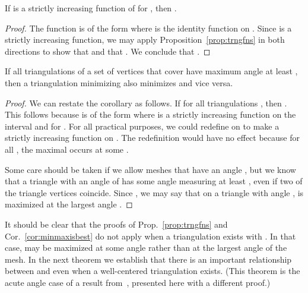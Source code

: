 \documentclass[final]{siamltex}
\begin{document}
\bigskip

\begin{corollary}
  If  is a strictly increasing function of  for , then .
\end{corollary}

\begin{proof}
  The function  is of the form  where  is the
  identity function on .  Since  is a strictly increasing
  function, we may apply Proposition~\ref{prop:trngfns} in both
  directions to show that 
  and that .  We conclude
  that .
\end{proof}

\bigskip

\begin{corollary}
\label{cor:minmaxisbest}
If all triangulations of a set of vertices  that cover
 have maximum angle at least , then a
triangulation minimizing  also minimizes  and vice
versa.
\end{corollary}
\begin{proof}
  We can restate the corollary as follows.  If  for
  all triangulations , then .  This follows because  is of the form 
  where  is a strictly
  increasing function on the interval  and  for .  For all practical purposes, we
  could redefine  on  to make  a strictly increasing
  function on .  The redefinition would have no effect
  because for all , the maximal  occurs at some
  .

  Some care should be taken if we allow meshes that have an angle
  , but we know that a triangle with an angle of  has
  some angle measuring at least , even if two of the triangle
  vertices coincide.  Since , we may say that on a
  triangle with angle ,  is maximized at the largest angle
  .
\end{proof}

\bigskip

It should be clear that the proofs of Prop.~\ref{prop:trngfns} and
Cor.~\ref{cor:minmaxisbest} do not apply when a triangulation exists
with .  In that case,  may be maximized at
some angle  rather than at the largest angle of the
mesh.  In the next theorem we establish that there is an important
relationship between  and  even
when a well-centered triangulation exists.  (This theorem
is the acute angle case of a result from~\cite{BeEp1995},
presented here with a different proof.)

\bigskip
\end{document}
